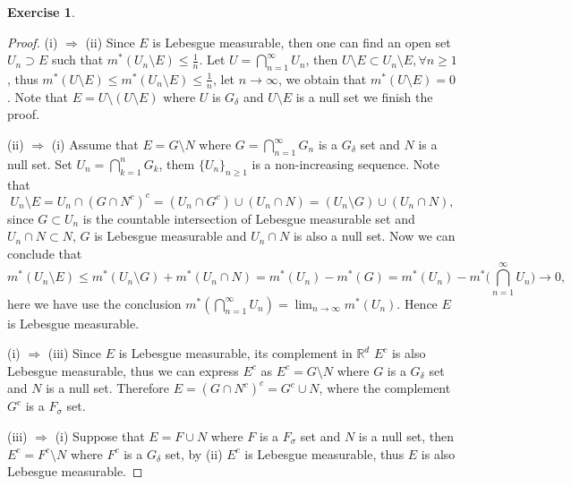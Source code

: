 \documentclass[a4paper]{article}
\newtheorem{ex}{Exercise}[subsection]
\begin{document}
\begin{ex}\end{ex}
\begin{proof}
(i) $\Rightarrow$ (ii) Since $E$ is Lebesgue measurable, then one can find 
an open set $U_n \supset E$ such that $m^*(U_n \setminus E) \leq \frac{1}{n}$. Let $U = \bigcap_{n = 1}^\infty U_n$, then 
$U \setminus E \subset U_n \setminus E, \forall n \geq 1$, thus $m^*(U \setminus E) \leq m^*(U_n \setminus E) \leq \frac{1}{n}$,
let $n \to \infty$, we obtain that $m^*(U \setminus E) = 0$. Note that $E = U\setminus (U \setminus E)$ where $U$ is $G_\delta$
and $U \setminus E$ is a null set we finish the proof.

(ii) $\Rightarrow$ (i) Assume that $E = G \setminus N$ where $G = \bigcap_{n = 1}^\infty G_n$ is a $G_\delta$ set 
and $N$ is a null set. Set $U_n = \bigcap_{k = 1}^n G_k$, them $\{U_n\}_{n \geq 1}$ is a non-increasing sequence.
Note that$$
U_n \setminus E = U_n \cap (G \cap N^c)^c = (U_n \cap G^c) \cup (U_n \cap N) = (U_n \setminus G) \cup (U_n \cap N),
$$since $G \subset U_n$ is the countable intersection of Lebesgue measurable set and $U_n \cap N \subset N$, 
$G$ is Lebesgue measurable and $U_n \cap N$ is also a null set. Now we can conclude that $$
m^*(U_n \setminus E) \leq m^*(U_n \setminus G) + m^*(U_n \cap N) = m^*(U_n) - m^*(G) = m^*(U_n) - 
m^*\Big(\bigcap_{n = 1}^\infty U_n\Big) \to 0,
$$here we have use the conclusion $m^*(\bigcap_{n = 1}^\infty U_n) = \lim_{n \to \infty} m^*(U_n)$.  Hence $E$ is
Lebesgue measurable.

(i) $\Rightarrow$ (iii) Since $E$ is Lebesgue measurable, its complement in $\mathbb{R}^d$ $E^c$ is also Lebesgue
measurable, thus we can express $E^c$ as $E^c = G \setminus N$ where $G$ is a $G_\delta$ set and $N$ is a null set.
Therefore $E = (G \cap N^c)^c = G^c \cup N$, where the complement $G^c$ is a $F_\sigma$ set.

(iii) $\Rightarrow$ (i) Suppose that $E = F \cup N$ where $F$ is a $F_\sigma$ set and $N$ is a null set, then 
$E^c = F^c \setminus N$ where $F^c$ is a $G_\delta$ set, by (ii) $E^c$ is Lebesgue measurable, thus $E$ is also 
Lebesgue measurable.
\end{proof}
\end{document}

